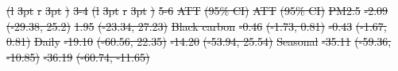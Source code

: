 \documentclass[
  letterpaper,
  DIV=11,
  numbers=noendperiod]{scrartcl}
\makeatletter
\renewenvironment{table}%
   {\renewcommand\familydefault\sfdefault
    \@float{table}}
   {\end@float}
\providecommand{\DIFdel}[1]{{\protect\color{red}\sout{#1}}}                      %
\providecommand{\DIFdelFL}[1]{\DIFdel{#1}} %
\providecommand{\DIFdelbeginFL}{} %
\newcommand{\DIFscaledelfig}{0.5}
\newlength{\DIFdelgraphicswidth} %
\newlength{\DIFdelgraphicsheight} %
\newcommand{\DIFdelincludegraphics}[2][]{%
\sbox{\DIFdelgraphicsbox}{\DIFOincludegraphics[#1]{#2}}%
\settoboxwidth{\DIFdelgraphicswidth}{\DIFdelgraphicsbox} %
\settoboxtotalheight{\DIFdelgraphicsheight}{\DIFdelgraphicsbox} %
\scalebox{\DIFscaledelfig}{%
\parbox[b]{\DIFdelgraphicswidth}{\usebox{\DIFdelgraphicsbox}\\[-\baselineskip] \rule{\DIFdelgraphicswidth}{0em}}\llap{\resizebox{\DIFdelgraphicswidth}{\DIFdelgraphicsheight}{%
\setlength{\unitlength}{\DIFdelgraphicswidth}%
\begin{picture}(1,1)%
\thicklines\linethickness{2pt} %
{\color[rgb]{1,0,0}\put(0,0){\framebox(1,1){}}}%
{\color[rgb]{1,0,0}\put(0,0){\line( 1,1){1}}}%
{\color[rgb]{1,0,0}\put(0,1){\line(1,-1){1}}}%
\end{picture}%
}\hspace*{3pt}}} %
} %
\DeclareRobustCommand{\DIFdelbeginFL}{\DIFOdelbeginFL \let\includegraphics\DIFdelincludegraphics} %
\makeatother
\begin{document}
\begin{table}
\DIFdelbeginFL %
\DIFdelFL{(l}%
\DIFdelFL{3pt}%
\DIFdelFL{r}%
\DIFdelFL{3pt}%
\DIFdelFL{)}%
\DIFdelFL{3-4}%
\DIFdelFL{(l}%
\DIFdelFL{3pt}%
\DIFdelFL{r}%
\DIFdelFL{3pt}%
\DIFdelFL{)}%
\DIFdelFL{5-6}%
\DIFdelFL{ATT }%
\DIFdelFL{(95\% CI) }%
\DIFdelFL{ATT }%
\DIFdelFL{(95\% CI)}%
\DIFdelFL{\hspace{1em} }%
\DIFdelFL{PM2.5 }%
\DIFdelFL{-2.09 }%
\DIFdelFL{(-29.38, 25.2) }%
\DIFdelFL{1.95 }%
\DIFdelFL{(-23.34, 27.23)}%
\DIFdelFL{Black carbon }%
\DIFdelFL{-0.46 }%
\DIFdelFL{(-1.73, 0.81) }%
\DIFdelFL{-0.43 }%
\DIFdelFL{(-1.67, 0.81)}%
\DIFdelFL{\hspace{1em} }%
\DIFdelFL{Daily }%
\DIFdelFL{-19.10 }%
\DIFdelFL{(-60.56, 22.35) }%
\DIFdelFL{-14.20 }%
\DIFdelFL{(-53.94, 25.54)}%
\DIFdelFL{Seasonal }%
\DIFdelFL{-35.11 }%
\DIFdelFL{(-59.36, -10.85) }%
\DIFdelFL{-36.19 }%
\DIFdelFL{(-60.74, -11.65)}%

\end{table}
\end{document}

